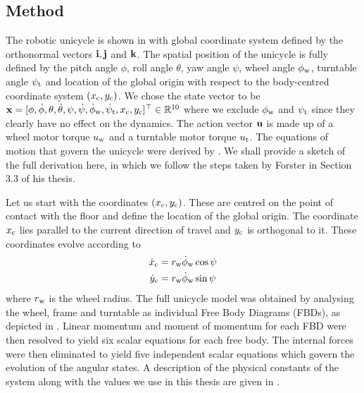 \subsection{Method}
The robotic unicycle is shown in  with global coordinate system defined by the orthonormal vectors $\mathbf{i}, \mathbf{j}$ and $\mathbf{k}$. The spatial position of the unicycle is fully defined by the pitch angle $\phi$, roll angle $\theta$, yaw angle $\psi$, wheel angle $\phi_{\text{w}}$, turntable angle $\psi_{\text{t}}$ and location of the global origin with respect to the body-centred coordinate system $(x_{\text{c}},y_{\text{c}})$. We chose the state vector to be $\mathbf{x} = [\phi,\dot\phi,\theta,\dot\theta,\psi,\dot\psi,\dot\phi_{\text{w}},\dot\psi_{\text{t}},x_{\text{c}},y_{\text{c}}]^\top \in\mathbb{R}^{10}$ where we exclude $\phi_{\text{w}}$ and $\psi_{\text{t}}$ since they clearly have no effect on the dynamics. The action vector $\mathbf{u}$ is made up of a wheel motor torque $u_{\text{w}}$ and a turntable motor torque $u_{\text{t}}$.
The equations of motion that govern the unicycle were derived by \cite{For09}. We shall provide a sketch of the full derivation here, in which we follow the steps taken by Forster in Section 3.3 of his thesis. 

Let us start with the coordinates $(x_{\text{c}},y_{\text{c}})$. These are centred on the point of contact with the floor and define the location of the global origin. The coordinate $x_{\text{c}}$ lies parallel to the current direction of travel and $y_{\text{c}}$ is orthogonal to it. These coordinates evolve according to
\begin{align}
\dot x_{\text{c}} &= r_{\text{w}} \dot\phi_{\text{w}} \cos\psi \label{eqn:xceqn}  \\
\dot y_{\text{c}} &= r_{\text{w}} \dot\phi_{\text{w}} \sin\psi \label{eqn:yceqn}
\end{align}
where $r_{\text{w}}$ is the wheel radius.
The full unicycle model was obtained by analysing the wheel, frame and turntable as individual Free Body Diagrams (FBDs), as depicted in . Linear momentum and moment of momentum for each FBD were then resolved to yield six scalar equations for each free body. The internal forces were then eliminated to yield five independent scalar equations which govern the evolution of the angular states. A description of the physical constants of the system along with the values we use in this thesis are given in .






